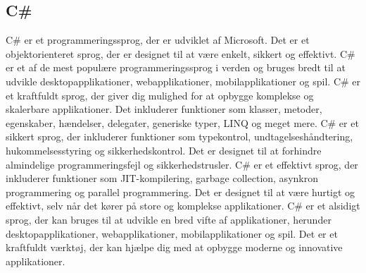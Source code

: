 \subsection{C\#}
C\# er et programmeringssprog, der er udviklet af Microsoft. Det er et objektorienteret sprog, der er designet til at være enkelt, sikkert og effektivt. C\# er et af de mest populære programmeringssprog i verden og bruges bredt til at udvikle desktopapplikationer, webapplikationer, mobilapplikationer og spil.
C\# er et kraftfuldt sprog, der giver dig mulighed for at opbygge komplekse og skalerbare applikationer. Det inkluderer funktioner som klasser, metoder, egenskaber, hændelser, delegater, generiske typer, LINQ og meget mere.
C\# er et sikkert sprog, der inkluderer funktioner som typekontrol, undtagelseshåndtering, hukommelsesstyring og sikkerhedskontrol. Det er designet til at forhindre almindelige programmeringsfejl og sikkerhedstrusler.
C\# er et effektivt sprog, der inkluderer funktioner som JIT-kompilering, garbage collection, asynkron programmering og parallel programmering. Det er designet til at være hurtigt og effektivt, selv når det kører på store og komplekse applikationer.
C\# er et alsidigt sprog, der kan bruges til at udvikle en bred vifte af applikationer, herunder desktopapplikationer, webapplikationer, mobilapplikationer og spil. Det er et kraftfuldt værktøj, der kan hjælpe dig med at opbygge moderne og innovative applikationer.

